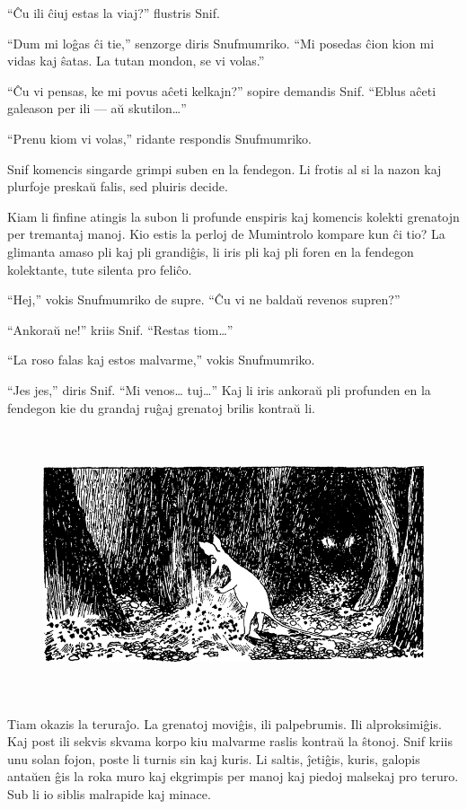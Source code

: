 ``Ĉu ili ĉiuj estas la viaj?'' flustris Snif.

``Dum mi loĝas ĉi tie,'' senzorge diris Snufmumriko. ``Mi posedas ĉion kion mi vidas kaj ŝatas. La tutan mondon, se vi volas.''

``Ĉu vi pensas, ke mi povus aĉeti kelkajn?'' sopire demandis Snif. ``Eblus aĉeti galeason per ili --- aŭ skutilon{\ldots}''

``Prenu kiom vi volas,'' ridante respondis Snufmumriko.

Snif komencis singarde grimpi suben en la fendegon. Li frotis al si la nazon kaj plurfoje preskaŭ falis, sed pluiris decide.

Kiam li finfine atingis la subon li profunde enspiris kaj komencis kolekti grenatojn per tremantaj manoj. Kio estis la perloj de Mumintrolo kompare kun ĉi tio? La glimanta amaso pli kaj pli grandiĝis, li iris pli kaj pli foren en la fendegon kolektante, tute silenta pro feliĉo.

``Hej,'' vokis Snufmumriko de supre. ``Ĉu vi ne baldaŭ revenos supren?''

``Ankoraŭ ne!'' kriis Snif. ``Restas tiom{\ldots}''

``La roso falas kaj estos malvarme,'' vokis Snufmumriko.

``Jes jes,'' diris Snif. ``Mi venos{\ldots} tuj{\ldots}'' Kaj li iris ankoraŭ pli profunden en la fendegon kie du grandaj ruĝaj grenatoj brilis kontraŭ li.

\begin{figure}[htbp]
\centering
\includegraphics[width=440pt,height=225pt]{3-6.png}
\caption{}
\label{3-6}
\end{figure}

Tiam okazis la teruraĵo. La grenatoj moviĝis, ili palpebrumis. Ili alproksimiĝis. Kaj post ili sekvis skvama korpo kiu malvarme raslis kontraŭ la ŝtonoj. Snif kriis unu solan fojon, poste li turnis sin kaj kuris. Li saltis, ĵetiĝis, kuris, galopis antaŭen ĝis la roka muro kaj ekgrimpis per manoj kaj piedoj malsekaj pro teruro. Sub li io siblis malrapide kaj minace.

